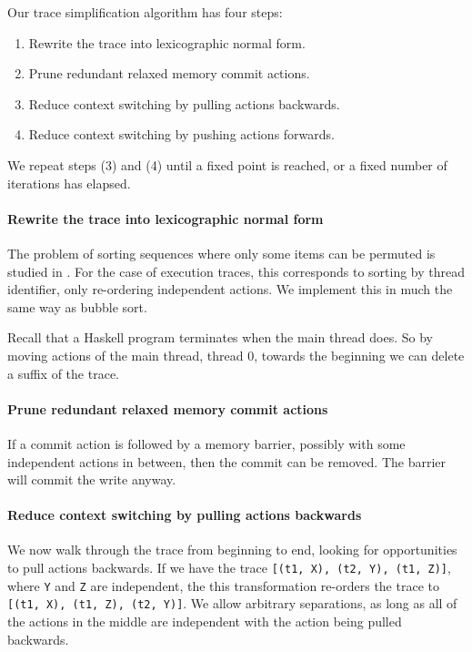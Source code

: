 Our trace simplification algorithm has four steps:

\begin{enumerate}
\item Rewrite the trace into lexicographic normal form.
\item Prune redundant relaxed memory commit actions.
\item Reduce context switching by pulling actions backwards.
\item Reduce context switching by pushing actions forwards.
\end{enumerate}

We repeat steps (3) and (4) until a fixed point is reached, or a fixed
number of iterations has elapsed.

\paragraph{Rewrite the trace into lexicographic normal form}
The problem of sorting sequences where only some items can be permuted
is studied in \cite{anisimov1979}.  For the case of execution traces,
this corresponds to sorting by thread identifier, only re-ordering
independent actions.  We implement this in much the same way as bubble
sort.

Recall that a Haskell program terminates when the main thread does.
So by moving actions of the main thread, thread 0, towards the
beginning we can delete a suffix of the trace.

\paragraph{Prune redundant relaxed memory commit actions}
If a commit action is followed by a memory barrier, possibly with some
independent actions in between, then the commit can be removed.  The
barrier will commit the write anyway.

\paragraph{Reduce context switching by pulling actions backwards}
We now walk through the trace from beginning to end, looking for
opportunities to pull actions backwards.  If we have the trace
\verb|[(t1, X), (t2, Y), (t1, Z)]|, where \verb|Y| and \verb|Z| are
independent, the this transformation re-orders the trace to
\verb|[(t1, X), (t1, Z), (t2, Y)]|.  We allow arbitrary separations,
as long as all of the actions in the middle are independent with the
action being pulled backwards.

